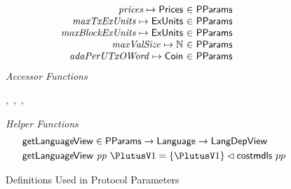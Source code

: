 \begin{figure*}[htb]
\begin{equation*}
\begin{array}{r@{~\in~}l@{\qquad}r}
        \var{prices} \mapsto \Prices & \PParams \\
        \var{maxTxExUnits} \mapsto \ExUnits & \PParams \\
        \var{maxBlockExUnits} \mapsto \ExUnits & \PParams \\
        \var{maxValSize} \mapsto \N & \PParams \\
        \var{adaPerUTxOWord} \mapsto \Coin & \PParams \\
      \end{array}
  \end{equation*}
  \emph{Accessor Functions}
  \begin{center}
  ,~,~,~
  \end{center}
  \emph{Helper Functions}
  \begin{align*}
    & \fun{getLanguageView} \in \PParams \to \Language \to \LangDepView \\
    & \fun{getLanguageView}~\var{pp}~\PlutusV1 = \{\PlutusV1\} \restrictdom \fun{costmdls}~{pp}
  \end{align*}
  \caption{Definitions Used in Protocol Parameters}
  \label{fig:defs:protocol-parameters}
\end{figure*}
